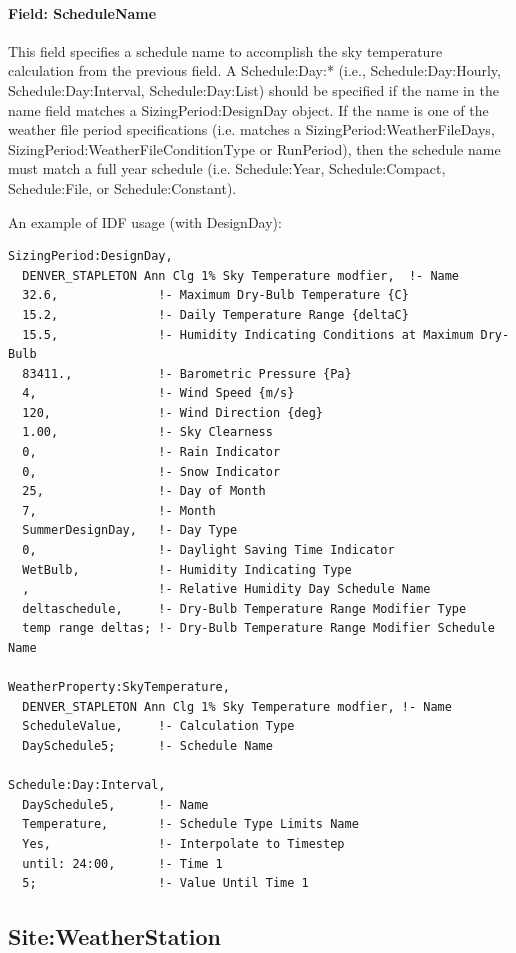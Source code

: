 \paragraph{Field: ScheduleName}\label{field-schedulename}

This field specifies a schedule name to accomplish the sky temperature calculation from the previous field. A Schedule:Day:* (i.e., Schedule:Day:Hourly, Schedule:Day:Interval, Schedule:Day:List) should be specified if the name in the name field matches a SizingPeriod:DesignDay object. If the name is one of the weather file period specifications (i.e. matches a SizingPeriod:WeatherFileDays, SizingPeriod:WeatherFileConditionType or RunPeriod), then the schedule name must match a full year schedule (i.e. Schedule:Year, Schedule:Compact, Schedule:File, or Schedule:Constant).

An example of IDF usage (with DesignDay):

\begin{lstlisting}
SizingPeriod:DesignDay,
  DENVER_STAPLETON Ann Clg 1% Sky Temperature modfier,  !- Name
  32.6,              !- Maximum Dry-Bulb Temperature {C}
  15.2,              !- Daily Temperature Range {deltaC}
  15.5,              !- Humidity Indicating Conditions at Maximum Dry-Bulb
  83411.,            !- Barometric Pressure {Pa}
  4,                 !- Wind Speed {m/s}
  120,               !- Wind Direction {deg}
  1.00,              !- Sky Clearness
  0,                 !- Rain Indicator
  0,                 !- Snow Indicator
  25,                !- Day of Month
  7,                 !- Month
  SummerDesignDay,   !- Day Type
  0,                 !- Daylight Saving Time Indicator
  WetBulb,           !- Humidity Indicating Type
  ,                  !- Relative Humidity Day Schedule Name
  deltaschedule,     !- Dry-Bulb Temperature Range Modifier Type
  temp range deltas; !- Dry-Bulb Temperature Range Modifier Schedule Name

WeatherProperty:SkyTemperature,
  DENVER_STAPLETON Ann Clg 1% Sky Temperature modfier, !- Name
  ScheduleValue,     !- Calculation Type
  DaySchedule5;      !- Schedule Name

Schedule:Day:Interval,
  DaySchedule5,      !- Name
  Temperature,       !- Schedule Type Limits Name
  Yes,               !- Interpolate to Timestep
  until: 24:00,      !- Time 1
  5;                 !- Value Until Time 1
\end{lstlisting}

\subsection{Site:WeatherStation}\label{siteweatherstation}

